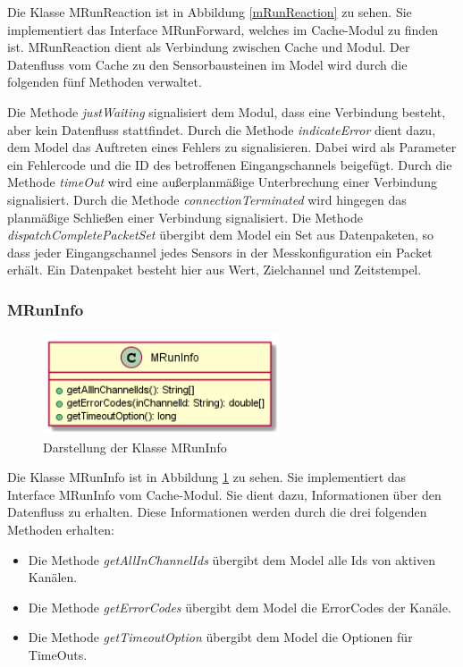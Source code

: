 \documentclass[parskip=full]{scrartcl}
\begin{document}
Die Klasse MRunReaction ist in Abbildung \ref{mRunReaction} zu sehen. Sie implementiert das Interface MRunForward, welches im Cache-Modul zu finden ist. MRunReaction dient als Verbindung zwischen Cache und Modul. Der Datenfluss vom Cache zu den Sensorbausteinen im Model wird durch die folgenden fünf Methoden verwaltet.
 
Die Methode \textit{justWaiting} signalisiert dem Modul, dass eine Verbindung besteht, aber kein Datenfluss stattfindet. Durch die Methode \textit{indicateError} dient dazu, dem Model das Auftreten eines Fehlers zu signalisieren. Dabei wird als Parameter ein Fehlercode und die ID des betroffenen Eingangschannels beigefügt. 
Durch die Methode \textit{timeOut} wird eine außerplanmäßige Unterbrechung einer Verbindung signalisiert. Durch die Methode \textit{connectionTerminated} wird hingegen das planmäßige Schließen einer Verbindung signalisiert. 
Die Methode \textit{dispatchCompletePacketSet} übergibt dem Model ein Set aus Datenpaketen, so dass jeder Eingangschannel jedes Sensors in der Messkonfiguration ein Packet erhält. Ein Datenpaket besteht hier aus Wert, Zielchannel und Zeitstempel.

\subsubsection{MRunInfo}

\begin{figure}[htbp]
	\begin{center}
		\includegraphics[width = 7cm]{Grafiken/MRunInfo.png}
		\caption{Darstellung der Klasse MRunInfo}
		\label{MRunInfo}
	\end{center}
\end{figure}



Die Klasse MRunInfo ist in Abbildung \ref{MRunInfo} zu sehen.
Sie implementiert das Interface MRunInfo vom Cache-Modul. Sie dient dazu, Informationen über den Datenfluss zu erhalten. Diese Informationen werden durch die drei folgenden Methoden erhalten:
 
\begin{itemize}

\item Die Methode \textit{getAllInChannelIds} übergibt dem Model alle Ids von aktiven Kanälen.
\item Die Methode \textit{getErrorCodes} übergibt dem Model die ErrorCodes der Kanäle. 
\item Die Methode \textit{getTimeoutOption} übergibt dem Model die Optionen für TimeOuts.


\end{itemize}
\end{document}
